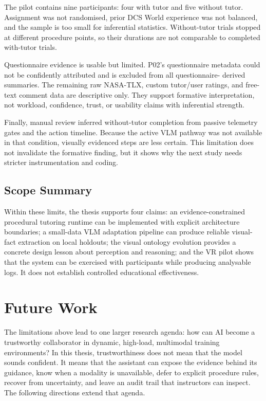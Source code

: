 The pilot contains nine participants: four with tutor and five without tutor.
Assignment was not randomised, prior DCS World experience was not balanced, and the
sample is too small for inferential statistics. Without-tutor trials stopped at
different procedure points, so their durations are not comparable to completed
with-tutor trials.

Questionnaire evidence is usable but limited. P02's questionnaire metadata
could not be confidently attributed and is excluded from all questionnaire-
derived summaries. The remaining raw NASA-TLX, custom tutor/user ratings, and
free-text comment data are descriptive only. They support formative
interpretation, not workload, confidence, trust, or usability claims with
inferential strength.

Finally, manual review inferred without-tutor completion from passive telemetry
gates and the action timeline. Because the active VLM pathway was not available
in that condition, visually evidenced steps are less certain. This limitation
does not invalidate the formative finding, but it shows why the next study needs
stricter instrumentation and coding.

\subsection{Scope Summary}

Within these limits, the thesis supports four claims: an evidence-constrained
procedural tutoring runtime can be implemented with explicit architecture
boundaries; a small-data VLM adaptation pipeline can produce reliable
visual-fact extraction on local holdouts; the visual ontology evolution provides
a concrete design lesson about perception and reasoning; and the VR pilot shows
that the system can be exercised with participants while producing analysable
logs. It does not establish controlled educational effectiveness.

\section{Future Work}\label{sec:disc-future}

The limitations above lead to one larger research agenda: how can AI become a
trustworthy collaborator in dynamic, high-load, multimodal training
environments? In this thesis, trustworthiness does not mean that the model
sounds confident. It means that the assistant can expose the evidence behind
its guidance, know when a modality is unavailable, defer to explicit procedure
rules, recover from uncertainty, and leave an audit trail that instructors can
inspect. The following directions extend that agenda.


